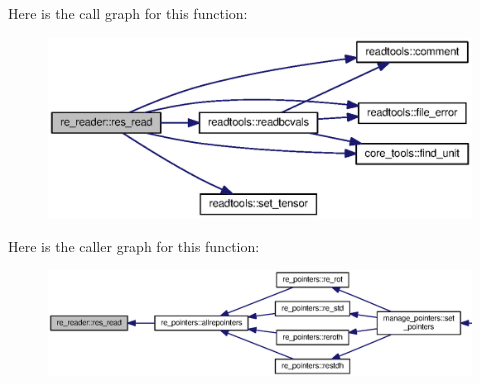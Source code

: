 Here is the call graph for this function\+:\nopagebreak
\begin{figure}[H]
\begin{center}
\leavevmode
\includegraphics[width=350pt]{namespacere__reader_abee07a4923b280459f7a1b135cc70346_cgraph}
\end{center}
\end{figure}




Here is the caller graph for this function\+:\nopagebreak
\begin{figure}[H]
\begin{center}
\leavevmode
\includegraphics[width=350pt]{namespacere__reader_abee07a4923b280459f7a1b135cc70346_icgraph}
\end{center}
\end{figure}


